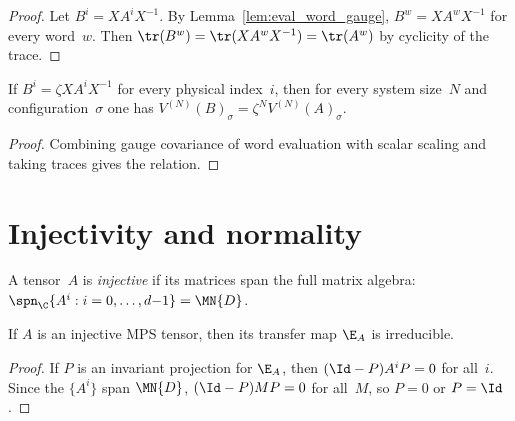 \begin{proof}\leanok
    Let $B^i = X A^i X^{-1}$.
    By Lemma~\ref{lem:eval_word_gauge}, $B^w = X A^w X^{-1}$
    for every word~$w$.
    Then $\tr(B^w) = \tr(X A^w X^{-1}) = \tr(A^w)$
    by cyclicity of the trace.
\end{proof}

\begin{lemma}\label{thm:gauge_phase_mpv_scaling}
    \leanok
    If $B^i = \zeta X A^i X^{-1}$ for every physical index~$i$, then for
    every system size~$N$ and configuration~$\sigma$ one has
    $V^{(N)}(B)_\sigma = \zeta^N V^{(N)}(A)_\sigma$.
\end{lemma}

\begin{proof}\leanok{}
    Combining gauge covariance of word evaluation with scalar scaling and
    taking traces gives the relation.
\end{proof}

\section{Injectivity and normality}

\begin{definition}[Injectivity]\label{def:injective}
    \leanok
    A tensor~$A$ is \emph{injective} if its matrices span the
    full matrix algebra:
    $\spn_{\C}\{A^i : i = 0,\ldots,d{-}1\} = \MN{D}$.
\end{definition}


\begin{lemma}\label{thm:injective_irreducible}
    \leanok
    If $A$ is an injective MPS tensor, then its transfer map $\E_A$
    is irreducible.
\end{lemma}

\begin{proof}
    \leanok
    If $P$ is an invariant projection for $\E_A$, then
    $(\Id-P)A^iP=0$ for all~$i$. Since the $\{A^i\}$ span $\MN{D}$,
    $(\Id-P)MP=0$ for all~$M$, so $P=0$ or $P=\Id$.
\end{proof}

